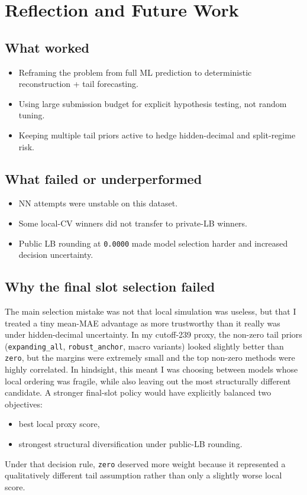 \section{Reflection and Future Work}

\subsection{What worked}
\begin{itemize}[leftmargin=1.5em]
  \item Reframing the problem from full ML prediction to deterministic reconstruction + tail forecasting.
  \item Using large submission budget for explicit hypothesis testing, not random tuning.
  \item Keeping multiple tail priors active to hedge hidden-decimal and split-regime risk.
\end{itemize}

\subsection{What failed or underperformed}
\begin{itemize}[leftmargin=1.5em]
  \item NN attempts were unstable on this dataset.
  \item Some local-CV winners did not transfer to private-LB winners.
  \item Public LB rounding at \texttt{0.0000} made model selection harder and increased decision uncertainty.
\end{itemize}

\subsection{Why the final slot selection failed}
The main selection mistake was not that local simulation was useless, but that I treated a tiny mean-MAE advantage as more trustworthy than it really was under hidden-decimal uncertainty. In my cutoff-239 proxy, the non-zero tail priors (\texttt{expanding\_all}, \texttt{robust\_anchor}, macro variants) looked slightly better than \texttt{zero}, but the margins were extremely small and the top non-zero methods were highly correlated. In hindsight, this meant I was choosing between models whose local ordering was fragile, while also leaving out the most structurally different candidate. A stronger final-slot policy would have explicitly balanced two objectives:
\begin{itemize}[leftmargin=1.5em]
  \item best local proxy score,
  \item strongest structural diversification under public-LB rounding.
\end{itemize}
Under that decision rule, \texttt{zero} deserved more weight because it represented a qualitatively different tail assumption rather than only a slightly worse local score.

